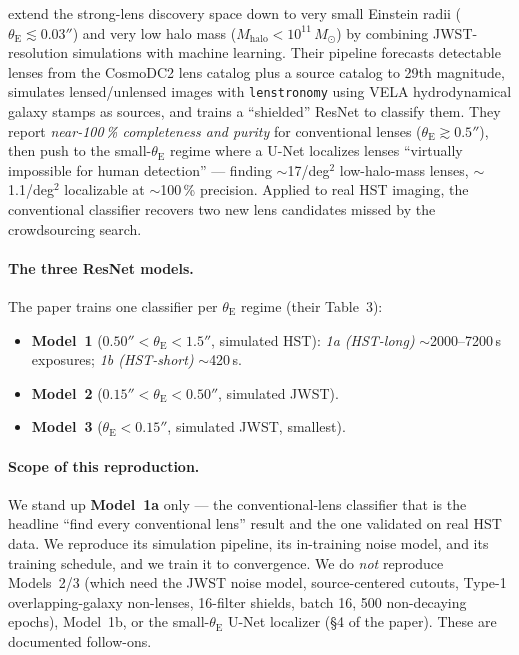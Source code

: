 \documentclass[11pt,letterpaper]{article}
\newcommand{\thetaE}{\ensuremath{\theta_{\mathrm{E}}}}
\newcommand{\Mhalo}{\ensuremath{M_{\mathrm{halo}}}}
\newcommand{\Msun}{\ensuremath{M_\odot}}
\begin{document}
\citet{silver2025ml} extend the strong-lens discovery space down to very
small Einstein radii ($\thetaE \lesssim 0.03''$) and very low halo mass
($\Mhalo < 10^{11}\,\Msun$) by combining JWST-resolution simulations with
machine learning. Their pipeline forecasts detectable lenses from the
CosmoDC2 \autocite{korytov2019cosmodc2} lens catalog plus a source
catalog to 29th magnitude, simulates lensed/unlensed images with
\texttt{lenstronomy} \autocite{birrer2018lenstronomy,birrer2021lenstronomy2}
using VELA hydrodynamical galaxy stamps
\autocite{snyder2018vela,simons2019vela} as sources, and trains a
``shielded'' ResNet \autocite{huang2021desi,he2016resnet} to classify
them. They report \emph{near-100\,\% completeness and purity} for
conventional lenses ($\thetaE \gtrsim 0.5''$), then push to the
small-$\thetaE$ regime where a U-Net \autocite{ronneberger2015unet}
localizes lenses ``virtually impossible for human detection'' --- finding
$\sim$17/deg$^2$ low-halo-mass lenses, $\sim$1.1/deg$^2$ localizable at
$\sim$100\,\% precision. Applied to real HST imaging, the conventional
classifier recovers two new lens candidates missed by the
\citet{garvin2022spacewarps} crowdsourcing search.

\paragraph{The three ResNet models.} The paper trains one classifier per
$\thetaE$ regime (their Table~3):
\begin{itemize}
\item \textbf{Model~1} ($0.50'' < \thetaE < 1.5''$, simulated HST):
      \emph{1a (HST-long)} $\sim$2000--7200\,s exposures; \emph{1b
      (HST-short)} $\sim$420\,s.
\item \textbf{Model~2} ($0.15'' < \thetaE < 0.50''$, simulated JWST).
\item \textbf{Model~3} ($\thetaE < 0.15''$, simulated JWST, smallest).
\end{itemize}

\paragraph{Scope of this reproduction.} We stand up \textbf{Model~1a}
only --- the conventional-lens classifier that is the headline
``find every conventional lens'' result and the one validated on real HST
data. We reproduce its simulation pipeline, its in-training noise model,
and its training schedule, and we train it to convergence. We do
\emph{not} reproduce Models~2/3 (which need the JWST noise model,
source-centered cutouts, Type-1 overlapping-galaxy non-lenses, 16-filter
shields, batch 16, 500 non-decaying epochs), Model~1b, or the
small-$\thetaE$ U-Net localizer (\S4 of the paper). These are documented
follow-ons.
\end{document}

